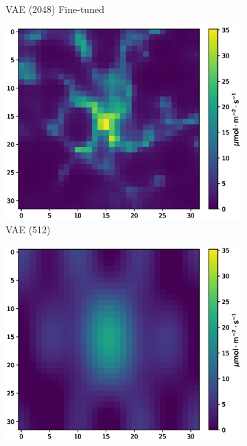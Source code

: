 \begin{figure}[htb]
\begin{minipage}[b]{\textwidth}
\begin{subfigure}[b]{0.32\textwidth}
            \caption{\gls{VAE} (2048) Fine-tuned}
        \end{subfigure}
        \begin{subfigure}[b]{0.32\textwidth}
            \includegraphics[width=\textwidth]{figures/06_results/gaussian_plume_example/munich/gen_512_snr_5_db.eps}
            \caption{\gls{VAE} (512)}
        \end{subfigure}
        \begin{subfigure}[b]{0.32\textwidth}
            \includegraphics[width=\textwidth]{figures/06_results/gaussian_plume_example/munich/bp_dct_snr_5_db.eps}

\end{subfigure}
\end{minipage}
\end{figure}
